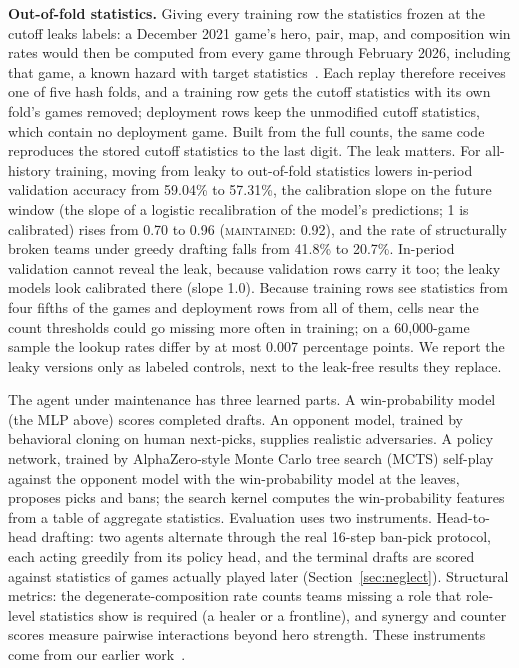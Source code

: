 \documentclass[journal]{IEEEtran}
\newcommand{\maintained}{\textsc{maintained}}          %
\begin{document}
\textbf{Out-of-fold statistics.} Giving every training row the
statistics frozen at the cutoff leaks labels: a December 2021 game's
hero, pair, map, and composition win rates would then be computed from
every game through February 2026, including that game, a known hazard
with target statistics~\cite{kaufman2012leakage,prokhorenkova2018catboost}.
Each replay therefore receives one of five hash folds, and a training
row gets the cutoff statistics with its own fold's games removed;
deployment rows keep the unmodified cutoff statistics, which contain no
deployment game. Built from the full counts, the same code reproduces
the stored cutoff statistics to the last digit. The leak matters.
For all-history training, moving from leaky to out-of-fold statistics
lowers in-period validation accuracy from 59.04\% to 57.31\%, the calibration slope
on the future window (the slope of a logistic recalibration of the
model's predictions; 1 is calibrated) rises from 0.70 to 0.96
(\maintained{}: 0.92), and the rate of structurally broken teams
under greedy drafting falls from 41.8\% to 20.7\%. In-period validation
cannot reveal the leak, because validation rows carry it too; the leaky
models look calibrated there (slope 1.0). Because training rows see
statistics from four fifths of the games and deployment rows from all of
them, cells near the count thresholds could go missing more often in
training; on a 60{,}000-game sample the lookup rates differ by at most
0.007 percentage points. We report the leaky versions only as labeled
controls, next to the leak-free results they replace.

The agent under maintenance has three learned parts. A win-probability
model (the MLP above) scores completed drafts. An opponent model,
trained by behavioral cloning on human next-picks, supplies realistic
adversaries. A policy network, trained by AlphaZero-style Monte Carlo
tree search (MCTS) self-play against the opponent model with the
win-probability model at the leaves, proposes picks and bans; the search
kernel computes the win-probability features from a table of aggregate
statistics. Evaluation uses two instruments. Head-to-head drafting: two
agents alternate through the real 16-step ban-pick protocol, each acting
greedily from its policy head, and the terminal drafts are scored against
statistics of games actually played later (Section~\ref{sec:neglect}).
Structural metrics: the degenerate-composition rate counts teams missing
a role that role-level statistics show is required (a healer or a
frontline), and synergy and counter scores measure pairwise interactions
beyond hero strength. These instruments come from our earlier
work~\cite{paper1}.
\end{document}
